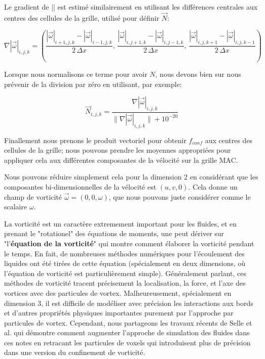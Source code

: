 \documentclass[11pt]{report}
\begin{document}
Le gradient de |\overrightarrow{\omega}| est estimé similairement en utilisant les différences centrales aux centres des cellules de la grille, utilisé pour définir $\overrightarrow{N}$:

\begin{equation}
\nabla |\overrightarrow{\omega}| _{i,j,k} = 
	\left(
		\frac{|\overrightarrow{\omega}|_{i+1,j,k} - |\overrightarrow{\omega}|_{i-1,j,k} }{2 \,\Delta x},\,
		\frac{|\overrightarrow{\omega}|_{i,j+1,k} - |\overrightarrow{\omega}|_{i,j-1,k} }{2 \,\Delta x},\,
		\frac{|\overrightarrow{\omega}|_{i,j,k+1} - |\overrightarrow{\omega}|_{i,j,k-1} }{2 \,\Delta x}
 	\right)
\end{equation}

Lorsque nous normalisons ce terme pour avoir $N$, nous devons bien sur nous prévenir de la division par zéro en utilisant, par exemple:

\begin{equation}
\overrightarrow{N}_{i,j,k} = \frac{\nabla |\overrightarrow{\omega}|_{i,j,k}}{\| \nabla |\overrightarrow{\omega}|_{i,j,k} \| + 10^{-20}}
\end{equation}

Finallement nous prenons le produit vectoriel pour obtenir $f_{conf}$ aux centres des cellules de la grille; nous pouvons prendre les moyennes appropriées pour appliquer cela aux différentes composantes de la vélocité sur la grille MAC. \newline

Nous pouvons réduire simplement cela pour la dimension 2 en considérant que les composantes bi-dimensionnelles de la vélocité est $(u,v,0)$. Cela donne un champ de vorticité $\overrightarrow{\omega} = (0,0,\omega)$, que nous pouvons juste considérer comme le scalaire $\omega$. \newline

La vorticité est un caractère extremement important pour les fluides, et en prenant le "rotationel" des équations de moments, une peut dériver sur "l'\textbf{équation de la vorticité}" qui montre comment élaborer la vorticité pendant le temps. En fait, de nombreuses méthodes numériques pour l'écoulement des liquides ont été tirées de cette équation (spécialement en deux dimensions, où l'équation de vorticité est particulièrement simple). Généralement parlant, ces méthodes de vorticité tracent précisement la localisation, la force, et l'axe des vortices avec des particules de vortex. Malheureusement, spécialement en dimension 3, il est difficile de modéliser avec précision les interactions aux bords et d'autres propriétés physiques importantes purement par l'approche par particules de vortex. Cependant, nous partageons les travaux récents de Selle et al. \cite{Selle-2005} qui démontre comment augmenter l'approche de simulation des fluides dans ces notes en retracant les particules de voxels qui introduisent plus de précision dans une version du confinement de vorticité. \newline
\end{document}
